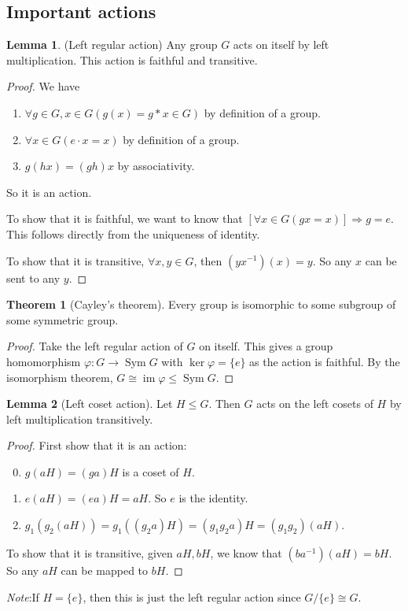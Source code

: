 \documentclass[a4paper]{article}
\theoremstyle{definition}
\newtheorem*{thm}{Theorem}
\newtheorem*{lemma}{Lemma}
\newcommand{\note}{\noindent \emph{Note}:\;}
\DeclareMathOperator\im{im}
\DeclareMathOperator\Sym{Sym}
\begin{document}
\subsection{Important actions}
\begin{lemma}
  (Left regular action) Any group $G$ acts on itself by left multiplication. This action is faithful and transitive.
\end{lemma}
\begin{proof}
  We have
  \begin{enumerate}[label=\arabic{*}.]
  \item $\forall g\in G, x\in G(g(x) = g*x \in G)$ by definition of a group.
  \item $\forall x\in G(e\cdot x = x)$ by definition of a group.
  \item $g(hx) = (gh)x$ by associativity.
  \end{enumerate}
  So it is an action.

  To show that it is faithful, we want to know that $[\forall x\in G(gx = x)]\Rightarrow g = e$. This follows directly from the uniqueness of identity.

  To show that it is transitive, $\forall x, y\in G$, then $(yx^{-1})(x) = y$. So any $x$ can be sent to any $y$.
\end{proof}

\begin{thm}[Cayley's theorem]
  Every group is isomorphic to some subgroup of some symmetric group.
\end{thm}

\begin{proof}
  Take the left regular action of $G$ on itself. This gives a group homomorphism $\varphi: G\to \Sym G$ with $\ker \varphi = \{e\}$ as the action is faithful. By the isomorphism theorem, $G \cong \im \varphi \leq \Sym G$.
\end{proof}

\begin{lemma}[Left coset action]
  Let $H\leq G$. Then $G$ acts on the left cosets of $H$ by left multiplication transitively.
\end{lemma}

\begin{proof}
  First show that it is an action:
  \begin{enumerate}[label=\arabic{*}.]
  \setcounter{enumi}{-1}
  \item $g(aH) = (ga)H$ is a coset of $H$.
  \item $e(aH) = (ea)H = aH$. So $e$ is the identity.
  \item $g_1(g_2(aH)) = g_1((g_2a)H) = (g_1g_2a)H = (g_1g_2)(aH)$.
  \end{enumerate}

  To show that it is transitive, given $aH, bH$, we know that $(ba^{-1})(aH) = bH$. So any $aH$ can be mapped to $bH$.
\end{proof}
\note If $H = \{e\}$, then this is just the left regular action since $G/\{e\} \cong G$.
\end{document}
